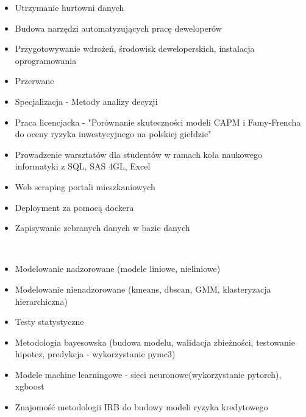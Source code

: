 \documentclass[10pt,a4paper,ragged2e,withhyper]{altacv}
\begin{document}
\begin{paracol}{1}
    \begin{itemize}
        \item Utrzymanie hurtowni danych
        \item Budowa narzędzi automatyzujących pracę deweloperów
        \item Przygotowywanie wdrożeń, środowisk deweloperskich, instalacja oprogramowania
    \end{itemize}

    \begin{itemize}
        \item Przerwane
    \end{itemize}
    \divider
    \newpage
    \begin{itemize}
        \item Specjalizacja - Metody analizy decyzji
        \item Praca licencjacka - "Porównanie skuteczności modeli CAPM i Famy-Frencha do oceny ryzyka inwestycyjnego na polskiej giełdzie"
        \item Prowadzenie warsztatów dla studentów w ramach koła naukowego informatyki z SQL, SAS 4GL, Excel
    \end{itemize}

    \begin{itemize}
        \item Web scraping portali mieszkaniowych
        \item Deployment za pomocą dockera
        \item Zapisywanie zebranych danych w bazie danych
    \end{itemize}


    \\
    \begin{itemize}
        \item Modelowanie nadzorowane (modele liniowe, nieliniowe)
        \item Modelowanie nienadzorowane (kmeans, dbscan, GMM, klasteryzacja hierarchiczna)
        \item Testy statystyczne
        \item Metodologia bayesowska (budowa modelu, walidacja zbieżności, testowanie hipotez, predykcja - wykorzystanie pymc3)
        \item Modele machine learningowe - sieci neuronowe(wykorzystanie pytorch), xgboost
        \item Znajomość metodologii IRB do budowy modeli ryzyka kredytowego
    \end{itemize}


\end{paracol}
\end{document}
